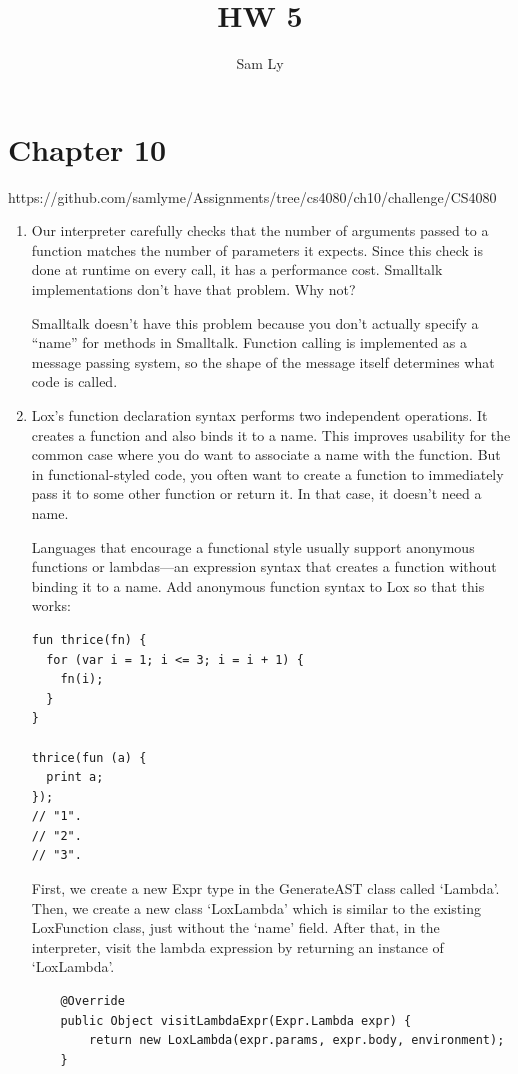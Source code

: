 \documentclass{article}
\title{HW 5}
\author{Sam Ly}
\begin{document}
\maketitle

\section*{Chapter 10}

https://github.com/samlyme/Assignments/tree/cs4080/ch10/challenge/CS4080

\begin{enumerate}
    \item {
        Our interpreter carefully checks that the number of arguments passed to a function matches the number of parameters it expects. Since this check is done at runtime on every call, it has a performance cost. Smalltalk implementations don’t have that problem. Why not?

        Smalltalk doesn't have this problem because you don't actually specify a 
        ``name'' for methods in Smalltalk. Function calling is implemented as a 
        message passing system, so the shape of the message itself determines what
        code is called.
    }

    \item {
        Lox’s function declaration syntax performs two independent operations. It creates a function and also binds it to a name. This improves usability for the common case where you do want to associate a name with the function. But in functional-styled code, you often want to create a function to immediately pass it to some other function or return it. In that case, it doesn’t need a name.

Languages that encourage a functional style usually support anonymous functions or lambdas—an expression syntax that creates a function without binding it to a name. Add anonymous function syntax to Lox so that this works:

        \begin{verbatim}
fun thrice(fn) {
  for (var i = 1; i <= 3; i = i + 1) {
    fn(i);
  }
}

thrice(fun (a) {
  print a;
});
// "1".
// "2".
// "3".
        \end{verbatim}

        First, we create a new Expr type in the GenerateAST class called `Lambda'.
        Then, we create a new class `LoxLambda' which is similar to the existing
        LoxFunction class, just without the `name' field. After that, in the interpreter, 
        visit the lambda expression by returning an instance of `LoxLambda'.
        \begin{verbatim}
    @Override
    public Object visitLambdaExpr(Expr.Lambda expr) {
        return new LoxLambda(expr.params, expr.body, environment);
    }
        \end{verbatim}

}
\end{enumerate}
\end{document}
